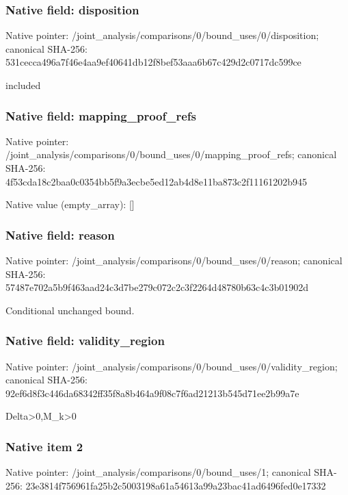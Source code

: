 \documentclass[10pt,a4paper]{article}
\begin{document}
\subsubsection{Native field: disposition}
Native pointer: /joint\_\allowbreak{}analysis/comparisons/0/bound\_\allowbreak{}uses/0/disposition; canonical SHA-256: 531cecca496a7f46e4aa9ef40641db12f8bef53aaa6b67c429d2c0717dc599ce

\begingroup\raggedright\sloppy included\par\endgroup

\subsubsection{Native field: mapping\_\allowbreak{}proof\_\allowbreak{}refs}
Native pointer: /joint\_\allowbreak{}analysis/comparisons/0/bound\_\allowbreak{}uses/0/mapping\_\allowbreak{}proof\_\allowbreak{}refs; canonical SHA-256: 4f53cda18c2baa0c0354bb5f9a3ecbe5ed12ab4d8e11ba873c2f11161202b945

Native value (empty\_\allowbreak{}array): []

\subsubsection{Native field: reason}
Native pointer: /joint\_\allowbreak{}analysis/comparisons/0/bound\_\allowbreak{}uses/0/reason; canonical SHA-256: 57487e702a5b9f463aad24c3d7be279c072c2c3f2264d48780b63c4c3b01902d

\begingroup\raggedright\sloppy Conditional unchanged bound.\par\endgroup

\subsubsection{Native field: validity\_\allowbreak{}region}
Native pointer: /joint\_\allowbreak{}analysis/comparisons/0/bound\_\allowbreak{}uses/0/validity\_\allowbreak{}region; canonical SHA-256: 92ef6d8f3c446da68342ff35f8a8b464a9f08c7f6ad21213b545d71ee2b99a7e

\begingroup\raggedright\sloppy Delta>0,\allowbreak{}M\_\allowbreak{}k>0\par\endgroup

\subsubsection{Native item 2}
Native pointer: /joint\_\allowbreak{}analysis/comparisons/0/bound\_\allowbreak{}uses/1; canonical SHA-256: 23e3814f756961fa25b2c5003198a61a54613a99a23bac41ad6496fed0e17332
\end{document}
